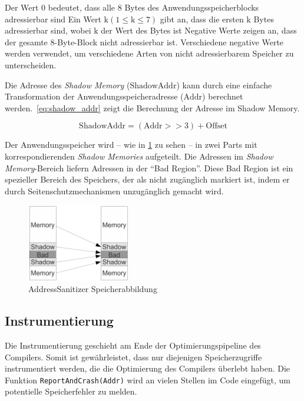 \documentclass[acmtog,nonacm]{acmart}
\begin{document}
\begin{outline}
  \1 Der Wert $0$ bedeutet, dass alle 8 Bytes des Anwendungsspeicherblocks adressierbar sind
  \1 Ein Wert $\text{k}(1\le\text{k}\le7)$ gibt an, dass die ersten $\text{k}$ Bytes adressierbar sind, wobei $\text{k}$ der Wert des Bytes ist
  \1 Negative Werte zeigen an, dass der gesamte 8-Byte-Block nicht adressierbar ist. Verschiedene negative Werte werden verwendet, um verschiedene Arten von nicht adressierbarem Speicher zu unterscheiden.
\end{outline}

Die Adresse des \textit{Shadow Memory} ($\text{ShadowAddr}$) kann durch eine
einfache Transformation der Anwendungsspeicheradresse ($\text{Addr}$) berechnet
werden.~\cref{eq:shadow_addr} zeigt die Berechnung der Adresse im Shadow Memory.

\begin{equation}
  \text{ShadowAddr} = (\text{Addr} >> 3) + \text{Offset}
  \label{eq:shadow_addr}
\end{equation}

Der Anwendungsspeicher wird -- wie in \cref{fig:shadow-memory} zu sehen -- in
zwei Parts mit korrespondierenden \textit{Shadow Memories} aufgeteilt. Die
Adressen im \textit{Shadow Memory}-Bereich liefern Adressen in der "`Bad
Region"'. Diese Bad Region ist ein spezieller Bereich des Speichers, der als
nicht zugänglich markiert ist, indem er durch Seitenschutzmechanismen
unzugänglich gemacht wird.

\begin{figure}[h]
  \includegraphics[width=0.4\textwidth]{img/shadow-memory.png}
  \caption{AddressSanitizer Speicherabbildung}
  \label{fig:shadow-memory}
\end{figure}

\subsection{Instrumentierung}

Die Instrumentierung geschieht am Ende der Optimierungspipeline des Compilers. 
Somit ist gewährleistet, dass nur diejenigen Speicherzugriffe instrumentiert
werden, die die Optimierung des Compilers überlebt haben. Die Funktion
\lstinline{ReportAndCrash(Addr)} wird an vielen Stellen im Code eingefügt, um
potentielle Speicherfehler zu melden.
\end{document}
